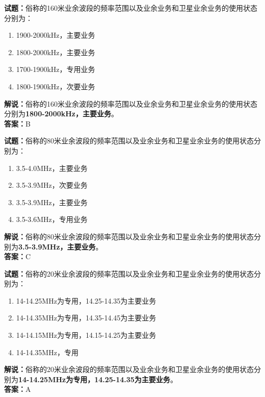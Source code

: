 \documentclass{ctexbook}
\begin{document}
\vspace{1em}

\textbf{试题：}俗称的160米业余波段的频率范围以及业余业务和卫星业余业务的使用状态分别为：
\begin{enumerate}[leftmargin=3em]
  \item 1900-2000\unit{\kHz}，主要业务
  \item 1800-2000\unit{\kHz}，主要业务
  \item 1700-1900\unit{\kHz}，专用业务
  \item 1800-1900\unit{\kHz}，次要业务
\end{enumerate}
\noindent\textbf{解说：}俗称的160米业余波段的频率范围以及业余业务和卫星业余业务的使用状态分别为\textbf{1800-2000\unit{\kHz}，主要业务}。\\\noindent\textbf{答案：}B

\vspace{1em}

\textbf{试题：}俗称的80米业余波段的频率范围以及业余业务和卫星业余业务的使用状态分别为：
\begin{enumerate}[leftmargin=3em]
  \item 3.5-4.0\unit{\MHz}，主要业务
  \item 3.5-3.9\unit{\MHz}，次要业务
  \item 3.5-3.9\unit{\MHz}，主要业务
  \item 3.5-3.6\unit{\MHz}，专用业务
\end{enumerate}
\noindent\textbf{解说：}俗称的80米业余波段的频率范围以及业余业务和卫星业余业务的使用状态分别为\textbf{3.5-3.9\unit{\MHz}，主要业务}。\\\noindent\textbf{答案：}C

\vspace{1em}

\textbf{试题：}俗称的20米业余波段的频率范围以及业余业务和卫星业余业务的使用状态分别为：
\begin{enumerate}[leftmargin=3em]
  \item 14-14.25\unit{\MHz}为专用，14.25-14.35为主要业务
  \item 14-14.35\unit{\MHz}为专用，14.35-14.45为主要业务
  \item 14-14.15\unit{\MHz}为专用，14.15-14.25为主要业务
  \item 14-14.35\unit{\MHz}，专用
\end{enumerate}
\noindent\textbf{解说：}俗称的20米业余波段的频率范围以及业余业务和卫星业余业务的使用状态分别为\textbf{14-14.25\unit{\MHz}为专用，14.25-14.35为主要业务}。\\\noindent\textbf{答案：}A
\end{document}
